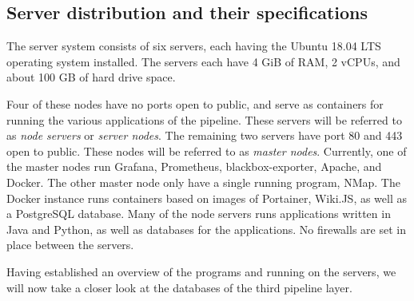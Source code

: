 \subsection{Server distribution and their specifications}
The \knox{} server system consists of six servers, each having the Ubuntu 18.04 LTS operating system installed. The servers each have 4 GiB of RAM, 2 vCPUs, and about 100 GB of hard drive space. 

Four of these nodes have no ports open to public, and serve as containers for running the various applications of the \knox{} pipeline.
These servers will be referred to as \textit{node servers} or \textit{server nodes}. The remaining two servers have port 80 and 443 open to public. These nodes will be referred to as \textit{master nodes}.
Currently, one of the master nodes run Grafana, Prometheus, blackbox-exporter, Apache, and Docker. The other master node only have a single running program, NMap.
The Docker instance runs containers based on images of Portainer, Wiki.JS, as well as a PostgreSQL database.
Many of the node servers runs applications written in Java and Python, as well as databases for the applications. 
No firewalls are set in place between the servers.

Having established an overview of the programs and running on the servers, we will now take a closer look at the databases of the third pipeline layer.

